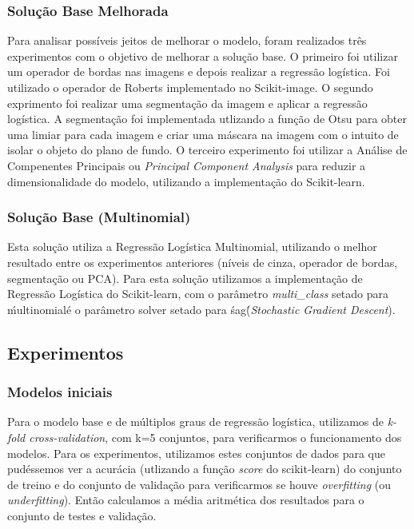 \documentclass[conference]{IEEEtran}
\begin{document}
\subsubsection{Solução Base Melhorada}
Para analisar possíveis jeitos de melhorar o modelo, foram realizados três experimentos com o objetivo de melhorar a solução base. O primeiro foi utilizar um operador de bordas nas imagens e depois realizar a regressão logística. Foi utilizado o operador de Roberts implementado no Scikit-image. O segundo exprimento foi realizar uma segmentação da imagem e aplicar a regressão logística. A segmentação foi implementada utlizando a função de Otsu para obter uma limiar para cada imagem e criar uma máscara na imagem com o intuito de isolar o objeto do plano de fundo. O terceiro experimento foi utilizar a Análise de Compenentes Principais ou \textit{Principal Component Analysis} para reduzir a dimensionalidade do modelo, utilizando a implementação do Scikit-learn.

\subsubsection{Solução Base (Multinomial)}
Esta solução utiliza a Regressão Logística Multinomial, utilizando o melhor resultado entre os experimentos anteriores (níveis de cinza, operador de bordas, segmentação ou PCA). Para esta solução utilizamos a implementação de Regressão Logística do Scikit-learn, com o parâmetro \textit{multi\_class} setado para \'multinomial\' e o parâmetro solver setado para \'sag\' (\textit{Stochastic Gradient Descent}).

\subsection{Experimentos}
\subsubsection{Modelos iniciais}
Para o modelo base e de múltiplos graus de regressão logística, utilizamos de \textit{k-fold cross-validation}, com k=5 conjuntos, para verificarmos o funcionamento dos modelos. Para os experimentos, utilizamos estes conjuntos de dados para que pudéssemos ver a acurácia (utlizando a função \textit{score} do scikit-learn) do conjunto de treino e do conjunto de validação para verificarmos se houve \textit{overfitting} (ou \textit{underfitting}). Então calculamos a média aritmética dos resultados para o conjunto de testes e validação.
\end{document}
